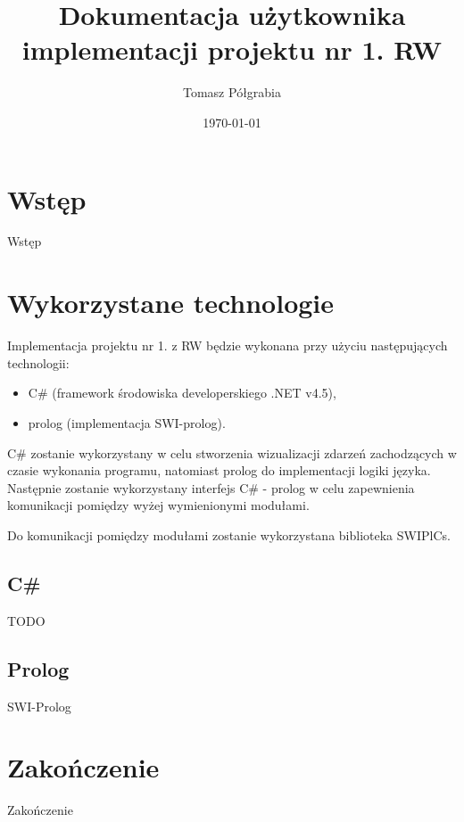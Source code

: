 \documentclass[a4paper]{article}
\title{Dokumentacja użytkownika implementacji projektu nr 1. RW}
\author{Tomasz Półgrabia}
\date{\today}
\begin{document}
\maketitle

\begin{abstract}

\end{abstract}

\section{Wstęp}
	Wstęp

\section{Wykorzystane technologie}
	Implementacja projektu nr 1. z RW będzie wykonana przy użyciu następujących technologii:
    \begin{itemize}
    	\item C\# (framework środowiska developerskiego .NET v4.5),
        \item prolog (implementacja SWI-prolog).
    \end{itemize}
    
    C\# zostanie wykorzystany w celu stworzenia wizualizacji zdarzeń zachodzących w czasie wykonania
    programu, natomiast prolog do implementacji logiki języka. Następnie zostanie wykorzystany
    interfejs C\# - prolog w celu zapewnienia komunikacji pomiędzy wyżej wymienionymi modułami.
    
    Do komunikacji pomiędzy modułami zostanie wykorzystana biblioteka SWIPlCs.
    
    \subsection{C\#}
    	TODO
    
    \subsection{Prolog}
    	SWI-Prolog

\section{Zakończenie}
	Zakończenie
\end{document}
